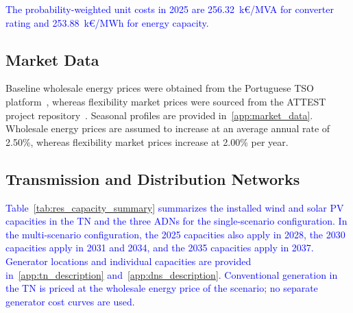 \documentclass[preprint,12pt]{elsarticle}
\begin{document}

\textcolor{blue}{
    The probability-weighted unit costs in 2025 are 256.32~k\euro{}/MVA for converter rating and 253.88~k\euro{}/MWh for energy capacity.
}

\subsection{Market Data}

Baseline wholesale energy prices were obtained from the Portuguese TSO platform~\cite{ren_market_platform}, whereas flexibility market prices were sourced from the ATTEST project repository~\cite{attest_project_repo}. Seasonal profiles are provided in~\ref{app:market_data}. Wholesale energy prices are assumed to increase at an average annual rate of 2.50\%, whereas flexibility market prices increase at 2.00\% per year.

\subsection{Transmission and Distribution Networks}
\label{subsec:case_study_adns}

\textcolor{blue}{
    Table~\ref{tab:res_capacity_summary} summarizes the installed wind and solar PV capacities in the TN and the three ADNs for the single-scenario configuration. In the multi-scenario configuration, the 2025 capacities also apply in 2028, the 2030 capacities apply in 2031 and 2034, and the 2035 capacities apply in 2037. 
    Generator locations and individual capacities are provided in~\ref{app:tn_description} and~\ref{app:dns_description}.
    Conventional generation in the TN is priced at the wholesale energy price of the scenario; no separate generator cost curves are used.
}
\end{document}
